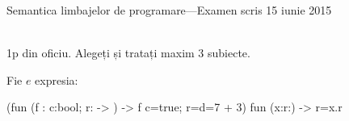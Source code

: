 \documentclass[addpoints,12pt,a4paper,answers]{exam}
\newcommand{\getHeight}[1]{%
}
\newenvironment{solutie}{\par\hspace*{-9em}\begin{minipage}{.98\paperwidth}
\hrulefill {\bf Rezolvare} \hrulefill}{\hrulefill\end{minipage}}
\begin{document}
\begin{center}


Semantica limbajelor de programare---Examen scris \hfill  15 iunie 2015 \\ \ \\

\end{center}


1p din oficiu.  Alegeți și tratați maxim 3 subiecte.


\begin{questions}

Fie $e$ expresia:
\begin{asciiml}
(fun (f : {c:bool; r:{}} -> {}) ->  f {c=true; r={d=7 + 3}}) fun (x:{r:{}}) ->  {r=x.r}
\end{asciiml}

\begin{parts}


%
%


\end{parts}
\end{questions}
\end{document}
